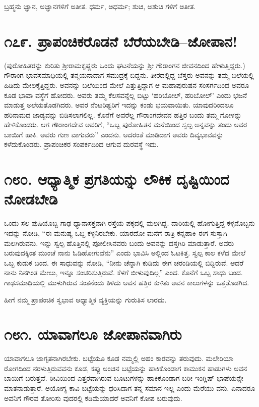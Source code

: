ಬ್ರಹ್ಮನು ಜ್ಞಾನ, ಅಜ್ಞಾನಗಳಿಗೆ ಅತೀತ. ಧರ್ಮ, ಅಧರ್ಮ; ಶುಚಿ, ಅಶುಚಿ ಗಳಿಗೆ ಅತೀತ.


\section{\num{೧೭೯. } ಪ್ರಾಪಂಚಿಕರೊಡನೆ ಬೆರೆಯಬೇಡಿ–ಜೋಪಾನ!}

(ಪುರೋಹಿತರನ್ನು ಕುರಿತು ಶ್ರೀರಾಮಕೃಷ್ಣರು ಒಂದು ಘಟನೆಯನ್ನು ಶ್ರೀ ಗೌರಾಂಗನ ಜೀವನದಿಂದ ಹೇಳುತ್ತಿದ್ದರು.) ಗೌರಾಂಗ ಭಾವಸಮಾಧಿಯಲ್ಲಿ ತನ್ಮಯನಾದಾಗ ಸಮುದ್ರಕ್ಕೆ ಬಿದ್ದನು. ತೀರದಲ್ಲಿದ್ದ ಬೆಸ್ತರು ಅವನನ್ನು ತಮ್ಮ ಬಲೆಯಲ್ಲಿ ಹಿಡಿದು ಮೇಲಕ್ಕೆತ್ತಿದ್ದರು. ಅವನನ್ನು ಬಲೆಯಿಂದ ಮೇಲೆ ಎತ್ತುತ್ತಿದ್ದಾಗ ಆ ಮಹಾಪುರುಷನ ಸಂಸರ್ಗದಿಂದ ಅವರೂ ಕೂಡ ಭಾವಾ ವಸ್ಥೆಗೆ ಹೋದರು. ಅವರು ತಮ್ಮ ಕೆಲಸವನ್ನೆಲ್ಲ ಬಿಟ್ಟು ‘ಹರಿಬೋಲ್, ಹರಿಬೋಲ್​’ ಎಂದು ಭಜನೆ ಮಾಡುತ್ತ ಅಲೆಯತೊಡಗಿದರು. ಅವರ ನೆಂಟರಿಷ್ಟರಿಗೆ ಇದನ್ನು ಕಂಡು ಭಯವಾಯಿತು. ಯಾವುದರಿಂದಲೂ ಹರಿನಾಮದ ಜಾಡ್ಯವನ್ನು ಬಿಡಿಸಲಾಗಲಿಲ್ಲ. ಕೊನೆಗೆ ಅವರೆಲ್ಲ ಗೌರಾಂಗದೇವನ ಹತ್ತಿರ ಬಂದು ತಮ್ಮ ಗೋಳನ್ನು ಹೇಳಿಕೊಂಡರು. ಆಗ ಗೌರಾಂಗದೇವ ಅವರಿಗೆ, “ಒಬ್ಬ ಪುರೋಹಿತನ ಮನೆಯಿಂದ ಸ್ವಲ್ಪ ಅನ್ನವನ್ನು ತಂದು ಅವರ ಬಾಯಿಗೆ ಹಾಕಿ. ಅವರು ಗುಣ ವಾಗುವರು” ಎಂದನು. ಅದರಂತೆ ಮಾಡಿದಾಗ ಅವರು ದಿವ್ಯಭಾವವನ್ನು ಕಳೆದುಕೊಂಡರು. ಪ್ರಾಪಂಚಿಕರ ಸಂಪರ್ಕದಿಂದ ಆಗುವ ದುರವಸ್ಥೆ ಇದು.


\section{\num{೧೮೦. } ಆಧ್ಯಾತ್ಮಿಕ ಪ್ರಗತಿಯನ್ನು ಲೌಕಿಕ ದೃಷ್ಟಿಯಿಂದ ನೋಡಬೇಡಿ}

ಒಂದು ಸಲ ಪುಷಿಯೊಬ್ಬ ಗಾಢ ಧ್ಯಾನಾಸಕ್ತನಾಗಿ ರಸ್ತೆಯ ಪಕ್ಕದಲ್ಲಿ ಮಲಗಿದ್ದ. ದಾರಿಯಲ್ಲಿ ಹೋಗುತ್ತಿದ್ದ ಕಳ್ಳನೊಬ್ಬನು ಇದನ್ನು ನೋಡಿ, “ಈ ಮನುಷ್ಯ ಒಬ್ಬ ಕಳ್ಳನಿರಬೇಕು. ಯಾರದೋ ಮನೆಗೆ ರಾತ್ರಿ ಕನ್ನಹಾಕಿ ಈಗ ಸುಸ್ತಾಗಿ ಮಲಗಿರುವನು. ಇನ್ನು ಸ್ವಲ್ಪ ಹೊತ್ತಿನಲ್ಲಿ ಪೋಲೀಸಿನವರು ಬಂದು ಅವನನ್ನು ದಸ್ತಗಿರಿ ಮಾಡುತ್ತಾರೆ. ಅವರು ಬರುವುದಕ್ಕಿಂತ ಮುಂಚೆ ನಾನು ಓಡಿಹೋಗುವೆನು” ಎಂದು ಭಾವಿಸಿ ಅಲ್ಲಿಂದ ಓಟಕಿತ್ತ. ಸ್ವಲ್ಪ ಕಾಲ ಕಳೆದ ಮೇಲೆ ಒಬ್ಬ ಕುಡುಕ ಬಂದ. ಈ ಸಾಧುವನ್ನು ನೋಡಿ, “ನೀನು ಚೆನ್ನಾಗಿ ಕುಡಿದು ಈಗ ಚರಂಡಿಯಲ್ಲಿ ಬಿದ್ದಿರುವೆ. ಆದರೆ ನಾನು ನಿನಗಿಂತ ಮೇಲು, ಇನ್ನೂ ಸಂಚರಿಸುತ್ತಿರುವೆ. ಕೆಳಗೆ ಬೀಳುವುದಿಲ್ಲ” ಎಂದ. ಕೊನೆಗೆ ಒಬ್ಬ ಸಾಧು ಬಂದ. ಗಾಢಸಮಾಧಿಯಲ್ಲಿ ಮುಳುಗಿರುವ ಸಂತನೆಂದು ತಿಳಿದು ಅವನ ಹತ್ತಿರ ಕುಳಿತು ಅವನ ಕಾಲುಗಳನ್ನು ಒತ್ತತೊಡಗಿದ.

ಹೀಗೆ ನಮ್ಮ ಪ್ರಾಪಂಚಿಕ ಸ್ವಭಾವ ಆಧ್ಯಾತ್ಮಿಕ ವ್ಯಕ್ತಿಯನ್ನು ಗುರುತಿಸ ಲಾರದು.


\section{\num{೧೮೧. } ಯಾವಾಗಲೂ ಜೋಪಾನವಾಗಿರು}

ಯಾವಾಗಲೂ ಜಾಗೃತನಾಗಿರಬೇಕು. ಬಟ್ಟೆಯೂ ಕೂಡ ನಮ್ಮಲ್ಲಿ ಅಹಂ ಕಾರವನ್ನು ತರುವುದು. ಮಲೇರಿಯಾ ರೋಗದಿಂದ ನರಳುತ್ತಿರುವವನು ಕೂಡ, ಕಪ್ಪು ಅಂಚಿನ ಬಟ್ಟೆಯನ್ನು ಹಾಕಿಕೊಂಡಾಗ ಕಾಮುಕನ ಹಾಡುಗಳು ಅವನ ಬಾಯಿಗೆ ಬರುತ್ತವೆ. ಠೀವಿಯಿಂದ ಎತ್ತರವಾಗಿರುವ ಬೂಟುಗಳನ್ನು ಹಾಕಿಕೊಂಡಾಗ ಬರೀ ಇಂಗ್ಲಿಷ್ ಭಾಷೆಯನ್ನೇ ಮಾತನಾಡುತ್ತಾರೆ. ಅಯೋಗ್ಯ ಕಾವಿ ಬಟ್ಟೆಯನ್ನು ಧರಿಸಿದಾಗ ತನ್ನ ಸಮಾನ ಇಲ್ಲ ಎಂದು ಮೆರೆಯು ವನು. ಏನಾದರೂ ಅವನಿಗೆ ಗೌರವ ತೋರಿಸು ವುದರಲ್ಲಿ ಕಡಿಮೆಯಾದರೆ ಅವನಿಗೆ ಕೋಪ ಬರುವುದು.


